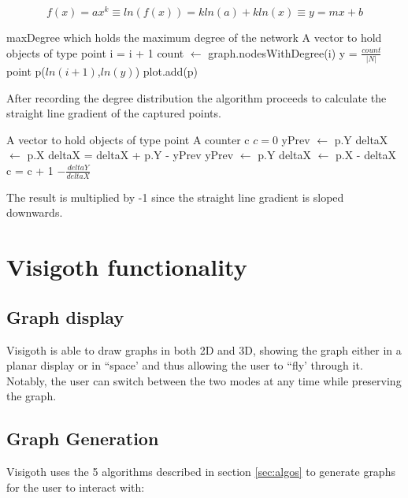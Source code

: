 \documentclass[a4paper,11pt,titlepage]{article}
\let\stdsection\section         %
\renewcommand{\section}{\newpage\stdsection}
\begin{document}
\[ f(x) = ax^k \equiv ln(f(x)) = kln(a) + kln(x) \equiv y = mx + b \]

\begin{algorithmic}
  \REQUIRE maxDegree which holds the maximum degree of the network
  \REQUIRE A vector to hold objects of type point
    \STATE i = i + 1
    \STATE count $\gets$ graph.nodesWithDegree(i)
    \STATE y = $\frac{count}{|N|}$
      \STATE  point p($ln(i+1)$,$ln(y)$)
      \STATE plot.add(p)
    \ENDIF
  \ENDFOR
\end{algorithmic}

After recording the degree distribution the algorithm proceeds to
calculate the straight line gradient of the captured points.

\begin{algorithmic}
  \REQUIRE A vector to hold objects of type point
  \REQUIRE A counter c
  \STATE $c = 0$
      \STATE yPrev $\gets$ p.Y
      \STATE deltaX $\gets$ p.X
    \ELSE
      \STATE deltaX = deltaX + p.Y - yPrev
      \STATE yPrev $\gets$ p.Y
      \STATE deltaX $\gets$ p.X - deltaX
    \ENDIF
      \STATE c = c + 1
  \ENDFOR
  \RETURN $- \frac{deltaY}{deltaX}$
\end{algorithmic}

The result is multiplied by -1 since the straight line
gradient is sloped downwards.



\section{Visigoth functionality}


\subsection{Graph display}
Visigoth is able to draw graphs in both 2D and 3D, showing the graph either
in a planar display or in ``space' and thus allowing the user to ``fly' through
it. Notably, the user can switch between the two modes at any time while
preserving the graph.

\subsection{Graph Generation}
Visigoth uses the 5 algorithms described in section \ref{sec:algos} to generate
graphs for the user to interact with:
\end{document}
